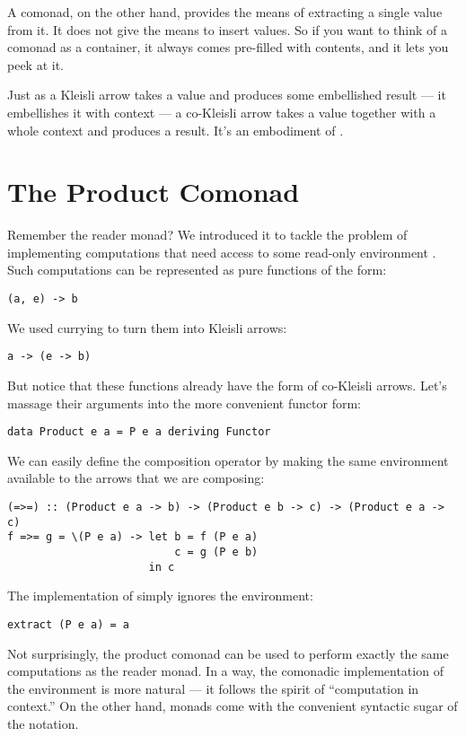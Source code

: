A comonad, on the other hand, provides the means of extracting a single
value from it. It does not give the means to insert values. So if you
want to think of a comonad as a container, it always comes pre-filled
with contents, and it lets you peek at it.

Just as a Kleisli arrow takes a value and produces some embellished
result --- it embellishes it with context --- a co-Kleisli arrow takes a
value together with a whole context and produces a result. It's an
embodiment of .

\section{The Product Comonad}

Remember the reader monad? We introduced it to tackle the problem of
implementing computations that need access to some read-only environment
. Such computations can be represented as pure functions of
the form:

\begin{Verbatim}
(a, e) -> b
\end{Verbatim}
We used currying to turn them into Kleisli arrows:

\begin{Verbatim}
a -> (e -> b)
\end{Verbatim}
But notice that these functions already have the form of co-Kleisli
arrows. Let's massage their arguments into the more convenient functor
form:

\begin{Verbatim}
data Product e a = P e a deriving Functor
\end{Verbatim}
We can easily define the composition operator by making the same
environment available to the arrows that we are composing:

\begin{verbatim}
(=>=) :: (Product e a -> b) -> (Product e b -> c) -> (Product e a -> c)
f =>= g = \(P e a) -> let b = f (P e a)
                          c = g (P e b) 
                      in c
\end{verbatim}
The implementation of  simply ignores the environment:

\begin{Verbatim}
extract (P e a) = a
\end{Verbatim}
Not surprisingly, the product comonad can be used to perform exactly the
same computations as the reader monad. In a way, the comonadic
implementation of the environment is more natural --- it follows the
spirit of ``computation in context.'' On the other hand, monads come
with the convenient syntactic sugar of the  notation.

